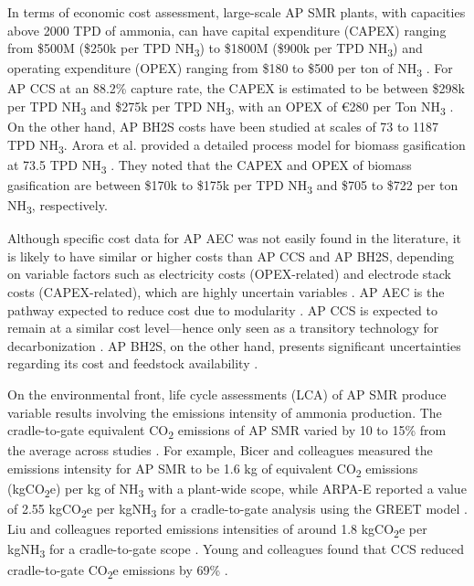 \documentclass{article}
\begin{document}
In terms of economic cost assessment, large-scale AP SMR plants, with capacities above 2000 TPD of ammonia, can have capital expenditure (CAPEX) ranging from \$500M (\$250k per TPD NH\textsubscript{3}) to \$1800M (\$900k per TPD NH\textsubscript{3}) and operating expenditure (OPEX) ranging from \$180 to \$500 per ton of NH\textsubscript{3} \cite{IEA2021, Pfromm2017, Maxwell2012}. For AP CCS at an 88.2\% capture rate, the CAPEX is estimated to be between \$298k per TPD NH\textsubscript{3} and \$275k per TPD NH\textsubscript{3}, with an OPEX of €280 per Ton NH\textsubscript{3} \cite{Pozo2022}. On the other hand, AP BH2S costs have been studied at scales of 73 to 1187 TPD NH\textsubscript{3}. Arora et al. provided a detailed process model for biomass gasification at 73.5 TPD NH\textsubscript{3} \cite{Arora2017}. They noted that the CAPEX and OPEX of biomass gasification are between \$170k to \$175k per TPD NH\textsubscript{3} and \$705 to \$722 per ton NH\textsubscript{3}, respectively.

Although specific cost data for AP AEC was not easily found in the literature, it is likely to have similar or higher costs than AP CCS and AP BH2S, depending on variable factors such as electricity costs (OPEX-related) and electrode stack costs (CAPEX-related), which are highly uncertain variables \cite{Sousa2022}. AP AEC is the pathway expected to reduce cost due to modularity \cite{Schmidt2017}. AP CCS is expected to remain at a similar cost level—hence only seen as a transitory technology for decarbonization \cite{MacFarlane2020}. AP BH2S, on the other hand, presents significant uncertainties regarding its cost and feedstock availability \cite{Sanchez2019, Tock2013, TUNA2014}.

On the environmental front, life cycle assessments (LCA) of AP SMR produce variable results involving the emissions intensity of ammonia production. The cradle-to-gate equivalent CO\textsubscript{2} emissions of AP SMR varied by 10 to 15\% from the average across studies \cite{Bicer2016, Bicer2017, Liu2020}. For example, Bicer and colleagues measured the emissions intensity for AP SMR to be 1.6 kg of equivalent CO\textsubscript{2} emissions (kgCO\textsubscript{2}e) per kg of NH\textsubscript{3} with a plant-wide scope, while ARPA-E reported a value of 2.55 kgCO\textsubscript{2}e per kgNH\textsubscript{3} for a cradle-to-gate analysis using the GREET model \cite{Bicer2016, Bicer2017}. Liu and colleagues reported emissions intensities of around 1.8 kgCO\textsubscript{2}e per kgNH\textsubscript{3} for a cradle-to-gate scope \cite{Liu2020}. Young and colleagues found that CCS reduced cradle-to-gate CO\textsubscript{2}e emissions by 69\% \cite{Young2019}.
\end{document}
